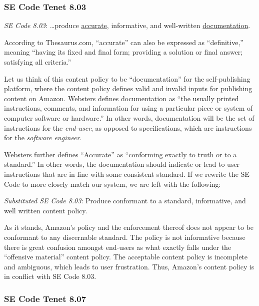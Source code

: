 \documentclass[11pt]{article}
\begin{document}
\begin{multicols}{2}
\subsubsection{SE Code Tenet 8.03}

\emph{SE Code 8.03}: \ldots produce \underline{accurate}, informative, and well-written \underline{documentation}. 

According to Thesaurus.com, ``accurate'' can also be expressed as ``definitive,'' meaning ``having its fixed and final form; providing a solution or final answer; satisfying all criteria.'' \cite{Thesaurus, Dictionary}  

Let us think of this content policy to be ``documentation'' for the self-publishing platform, where the content policy defines valid and invalid inputs for publishing content on Amazon.  Websters defines documentation as ``the usually printed instructions, comments, and information for using a particular piece or system of computer software or hardware.'' \cite{WebsterOnlineDict} In other words, documentation will be the set of instructions for the \emph{end-user}, as opposed to specifications, which are instructions for the \emph{software engineer}. 

Websters further defines ``Accurate'' as ``conforming exactly to truth or to a standard.'' \cite{WebsterOnlineDict} In other words, the documentation should indicate or lead to user instructions that are in line with some consistent standard.  If we rewrite the SE Code to more closely match our system, we are left with the following:

\emph{Substituted SE Code 8.03}: Produce conformant to a standard, informative, and well written content policy.

As it stands, Amazon's policy and the enforcement thereof does not appear to be conformant to any discernable standard.  The policy is not informative because there is great confusion amongst end-users as what exactly falls under the ``offensive material'' content policy.  \cite{KittSelfPubRevolution, ShermanAmazonExecs}  The acceptable content policy is incomplete and ambiguous, which leads to user frustration.  Thus, Amazon's content policy is in conflict with SE Code 8.03.


\subsubsection{SE Code Tenet 8.07}


\end{multicols}
\end{document}
